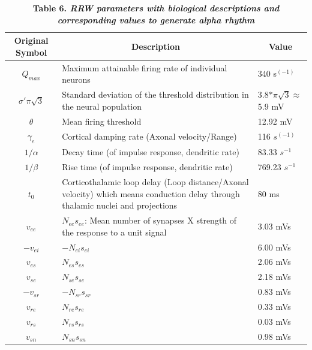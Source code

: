 \documentclass[12pt,twoside]{article}
\begin{document}
\begin{table}[H]
\begin{tabular}{|c|p{10cm}|p{2.5cm}| }
\hline
Original Symbol & \multicolumn{1}{|c|}{Description} & \multicolumn{1}{c|}{Value}  \\ 
 \hline
$Q_{max}$ & Maximum attainable firing rate of individual neurons & 340 s$^{(-1)}$\\ 
 \hline
$\sigma'\pi \sqrt{3}$ & Standard deviation of the threshold distribution in the neural population & 3.8$*\pi \sqrt{3} \approx $ 5.9  mV\\ 
 \hline
$\theta$ & Mean firing threshold & 12.92 mV \\
 \hline
$\gamma_{e}$ & Cortical damping rate (Axonal velocity/Range) & 116 $s^{(-1)}$\\
 \hline
$1/\alpha$ & Decay time (of impulse response, dendritic rate) & 83.33 $s^{-1}$\\
 \hline
$1/\beta$ & Rise time (of impulse response, dendritic rate) & 769.23 $s^{-1}$\\
\hline
$t_{0}$ & Corticothalamic loop delay (Loop distance/Axonal velocity) which means conduction delay through thalamic nuclei and projections & 80 ms\\
\hline
$v_{ee}$ & $N_{ee}s_{ee}$: Mean number of synapses X strength of the response to a unit signal & 3.03 mVs\\
\hline
$-v_{ei}$ & $-N_{ei}s_{ei}$ & 6.00 mVs\\
\hline
$v_{es}$ & $N_{es}s_{es}$ & 2.06 mVs\\
\hline
$v_{se}$ & $N_{se}s_{se}$ & 2.18 mVs\\
\hline
$-v_{sr}$ & $-N_{sr}s_{sr}$ & 0.83 mVs\\
\hline
$v_{re}$ & $N_{re}s_{re}$ & 0.33 mVs\\
\hline
$v_{rs}$ & $N_{rs}s_{rs}$ & 0.03 mVs\\
\hline
$v_{sn}$ & $N_{sn}s_{sn}$ & 0.98 mVs\\
\hline
\end{tabular}
\caption*{\textbf{Table 6.  \textit{RRW parameters with biological descriptions and corresponding values to generate alpha rhythm}}}
\label{tab:Robinson}
\end{table}
\end{document}
